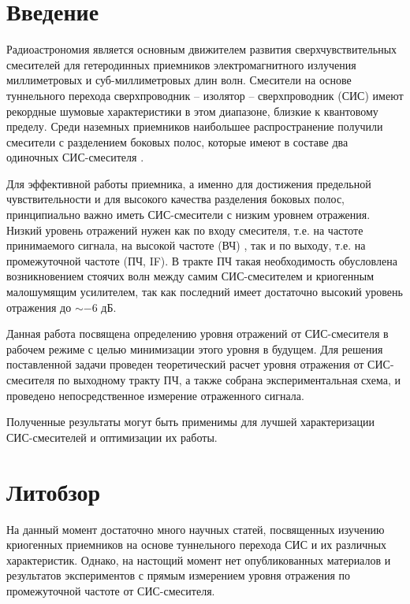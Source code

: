 \documentclass[a4paper]{article}
\begin{document}
\graphicspath{ {pictures/} }

\tableofcontents
\newpage

\section{Введение}

Радиоастрономия является основным движителем развития сверхчувствительных смесителей для гетеродинных приемников электромагнитного излучения 
миллиметровых и суб-миллиметровых длин волн. Смесители на основе туннельного перехода сверхпроводник – изолятор – сверхпроводник (СИС) \cite{Tucker} 
имеют рекордные шумовые характеристики в этом диапазоне, близкие к квантовому пределу. Среди наземных приемников наибольшее распространение получили 
смесители с разделением боковых полос, которые имеют в составе два одиночных СИС-смесителя \cite{Belitsky} \cite{Chenu}. 
\par

Для эффективной работы 
приемника, а именно для достижения предельной чувствительности и для высокого качества разделения боковых полос, принципиально важно иметь СИС-смесители 
с низким уровнем отражения. Низкий уровень отражений нужен как по входу смесителя, т.е. на частоте принимаемого сигнала, на высокой частоте (ВЧ) 
\cite{Hesper} \cite{Khudchenko}, так и по выходу, т.е. на промежуточной частоте (ПЧ, IF). В тракте ПЧ такая необходимость обусловлена возникновением 
стоячих волн между самим СИС-смесителем и криогенным малошумящим усилителем, так как последний имеет достаточно высокий уровень отражения до $\sim -6$ дБ.
\par

Данная работа посвящена определению уровня отражений от 
СИС-смесителя в рабочем режиме с целью минимизации этого уровня в будущем. Для решения поставленной задачи проведен теоретический расчет уровня 
отражения от СИС-смесителя по выходному тракту ПЧ, а также собрана экспериментальная схема, и проведено непосредственное измерение отраженного сигнала.
\par 

Полученные результаты могут быть применимы для лучшей характеризации СИС-смесителей и оптимизации их работы.


\newpage
\section{Литобзор}

На данный момент достаточно много научных статей, посвященных изучению криогенных приемников на основе туннельного перехода СИС и их различных характеристик.
Однако, на настощий момент нет опубликованных материалов и результатов экспериментов с прямым измерением уровня отражения по промежуточной частоте от СИС-смесителя.
\par
\end{document}
